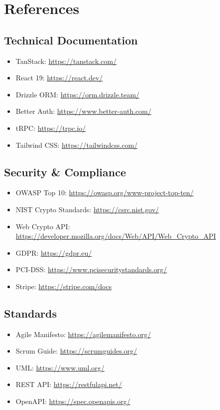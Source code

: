 \documentclass[12pt,a4paper]{article}
\begin{document}
\section{References}

\subsection{Technical Documentation}
\begin{itemize}[leftmargin=*]
  \item TanStack: \url{https://tanstack.com/}
  \item React 19: \url{https://react.dev/}
  \item Drizzle ORM: \url{https://orm.drizzle.team/}
  \item Better Auth: \url{https://www.better-auth.com/}
  \item tRPC: \url{https://trpc.io/}
  \item Tailwind CSS: \url{https://tailwindcss.com/}
\end{itemize}

\subsection{Security \& Compliance}
\begin{itemize}[leftmargin=*]
  \item OWASP Top 10: \url{https://owasp.org/www-project-top-ten/}
  \item NIST Crypto Standards: \url{https://csrc.nist.gov/}
  \item Web Crypto API: \url{https://developer.mozilla.org/docs/Web/API/Web_Crypto_API}
  \item GDPR: \url{https://gdpr.eu/}
  \item PCI-DSS: \url{https://www.pcisecuritystandards.org/}
  \item Stripe: \url{https://stripe.com/docs}
\end{itemize}

\subsection{Standards}
\begin{itemize}[leftmargin=*]
  \item Agile Manifesto: \url{https://agilemanifesto.org/}
  \item Scrum Guide: \url{https://scrumguides.org/}
  \item UML: \url{https://www.uml.org/}
  \item REST API: \url{https://restfulapi.net/}
  \item OpenAPI: \url{https://spec.openapis.org/}
\end{itemize}
\end{document}

